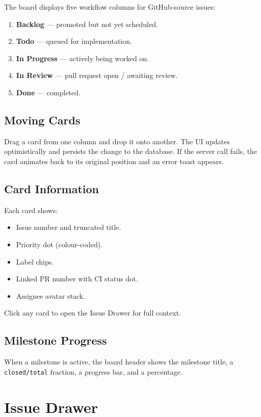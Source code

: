 \documentclass[12pt,a4paper]{report}
\begin{document}
The board displays five workflow columns for GitHub-source issues:
\begin{enumerate}
  \item \textbf{Backlog} --- promoted but not yet scheduled.
  \item \textbf{Todo} --- queued for implementation.
  \item \textbf{In Progress} --- actively being worked on.
  \item \textbf{In Review} --- pull request open / awaiting review.
  \item \textbf{Done} --- completed.
\end{enumerate}

\subsection{Moving Cards}

Drag a card from one column and drop it onto another.  The UI updates
optimistically and persists the change to the database.  If the server call
fails, the card animates back to its original position and an error toast
appears.

\subsection{Card Information}

Each card shows:
\begin{itemize}
  \item Issue number and truncated title.
  \item Priority dot (colour-coded).
  \item Label chips.
  \item Linked PR number with CI status dot.
  \item Assignee avatar stack.
\end{itemize}

Click any card to open the Issue Drawer for full context.

\subsection{Milestone Progress}

When a milestone is active, the board header shows the milestone title, a
\texttt{closed/total} fraction, a progress bar, and a percentage.

\section{Issue Drawer}
\end{document}
